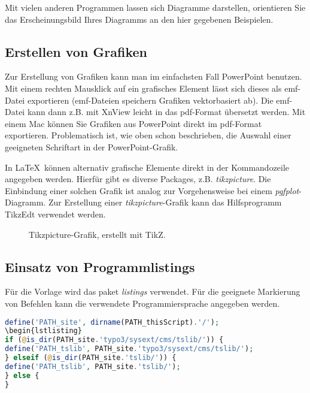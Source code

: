 Mit vielen anderen Programmen lassen sich Diagramme darstellen, orientieren Sie das Erscheinungsbild Ihres Diagramms an den hier gegebenen Beispielen.



\subsection{Erstellen von Grafiken}

Zur Erstellung von Grafiken kann man im einfachsten Fall PowerPoint benutzen. Mit einem rechten Mausklick auf ein grafisches Element lässt sich dieses als emf-Datei exportieren (emf-Dateien speichern Grafiken vektorbasiert ab). Die emf-Datei kann dann z.B. mit XnView leicht in das pdf-Format übersetzt werden. Mit einem Mac können Sie Grafiken aus PowerPoint direkt im pdf-Format exportieren. Problematisch ist, wie oben schon beschrieben, die Auswahl einer geeigneten Schriftart in der PowerPoint-Grafik.

In \LaTeX~können alternativ grafische Elemente direkt in der Kommandozeile angegeben werden. Hierfür gibt es diverse Packages, z.B. \textit{tikzpicture}. Die Einbindung einer solchen Grafik ist analog zur Vorgehensweise bei einem \textit{pgfplot}-Diagramm. Zur Erstellung einer  \textit{tikzpicture}-Grafik kann das Hilfsprogramm TikzEdt verwendet werden.

\begin{figure}[hbt]
	\centering
	
	\caption[Tikzpicture Grafik]{Tikzpicture-Grafik, erstellt mit TikZ.}
	\label{fig:le_block_p}
\end{figure}

\subsection{Einsatz von Programmlistings}
Für die Vorlage wird das paket \textit{listings} verwendet. Für die geeignete Markierung von Befehlen kann die verwendete Programmiersprache angegeben werden.

\begin{lstlisting}[language=PHP]
define('PATH_site', dirname(PATH_thisScript).'/');
\begin{lstlisting}
if (@is_dir(PATH_site.'typo3/sysext/cms/tslib/')) {
define('PATH_tslib', PATH_site.'typo3/sysext/cms/tslib/');
} elseif (@is_dir(PATH_site.'tslib/')) {
define('PATH_tslib', PATH_site.'tslib/');
} else {
}
\end{lstlisting}

